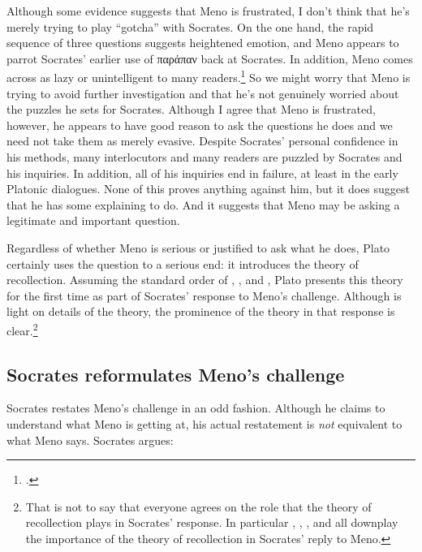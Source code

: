 Although some evidence suggests that Meno is frustrated, I don't think that he's merely trying to play ``gotcha'' with Socrates. On the one hand, the rapid sequence of three questions suggests heightened emotion, and Meno appears to parrot Socrates' earlier use of {\g παράπαν} back at Socrates. In addition, Meno comes across as lazy or unintelligent to many readers.\footcites[E.g.,][60--65]{scott2006}[and the authors cited in][3]{nehamas1985} So we might worry that Meno is trying to avoid further investigation and that he's not genuinely worried about the puzzles he sets for Socrates. Although I agree that Meno is frustrated, however, he appears to have good reason to ask the questions he does and we need not take them as merely evasive. Despite Socrates' personal confidence in his methods, many interlocutors and many readers are puzzled by Socrates and his inquiries. In addition, all of his inquiries end in failure, at least in the early Platonic dialogues. None of this proves anything against him, but it does suggest that he has some explaining to do. And it suggests that Meno may be asking a legitimate and important question.

Regardless of whether Meno is serious or justified to ask what he does, Plato certainly uses the question to a serious end: it introduces the theory of recollection. Assuming the standard order of , , and , Plato presents this theory for the first time as part of Socrates' response to Meno's challenge. Although  is light on details of the theory, the prominence of the theory in that response is clear.\footnote{That is not to say that everyone agrees on the role that the theory of recollection plays in Socrates' response. In particular \smartcite{irwin1977}, \smartcite{fine1992}, \smartcite{irwin1995}, and \smartcite{scott2006} all downplay the importance of the theory of recollection in Socrates' reply to Meno.}

\subsection{Socrates reformulates Meno's challenge}

Socrates restates Meno's challenge in an odd fashion. Although he claims to understand what Meno is getting at, his actual restatement is \textit{not} equivalent to what Meno says. Socrates argues:

